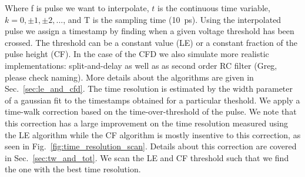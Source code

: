 \documentclass[preprint,1p]{elsarticle}
\begin{document}
Where f is pulse we want to interpolate, $t$ is the continuous time variable,
$k =0, \pm 1, \pm 2, ...$, and T is the sampling time (10~\si{ps}).
Using the interpolated pulse we assign a timestamp by finding when
a given voltage threshold has been crossed. The threshold can be a constant value (LE) or a constant fraction
 of the pulse height (CF).
In the case of the CFD we also simulate more realistic implementations: {\color{red}split-and-delay as well as as second order RC filter (Greg, please check naming)}.
 More details about the algorithms are given in Sec.~\ref{sec:le_and_cfd}. The time resolution is estimated by the width parameter
of a gaussian fit to the timestamps obtained for a particular theshold. We apply a time-walk correction based on the
time-over-threshold of the pulse. We note that this correction has a large improvement on the time resolution measured
using the LE algorithm while the CF algorithm is mostly insentive to this correction, as seen in Fig.~\ref{fig:time_resolution_scan}.
Details about this correction are covered in Sec.~\ref{sec:tw_and_tot}.
We scan the LE and CF threshold such that we find the one with the best time resolution.
\end{document}
